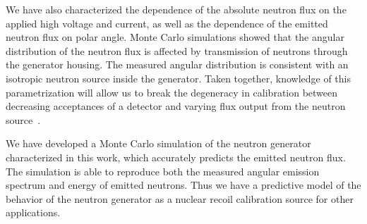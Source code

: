 We have also characterized the dependence of the absolute neutron flux on the applied high voltage and current, as well as the dependence of the emitted neutron flux on polar angle. Monte Carlo simulations showed that the angular distribution of the neutron flux is affected by transmission of neutrons through the generator housing. The measured angular distribution is consistent with an isotropic neutron source inside the generator. Taken together, knowledge of this parametrization will allow us to break the degeneracy in calibration between decreasing acceptances of a detector and varying flux output from the neutron source~\cite{Aprile:2013teh}.

We have developed a Monte Carlo simulation of the neutron generator characterized in this work, which accurately predicts the emitted neutron flux. The simulation is able to reproduce both the measured angular emission spectrum and energy of emitted neutrons. Thus we have a predictive model of the behavior of the neutron generator as a nuclear recoil calibration source for other applications.